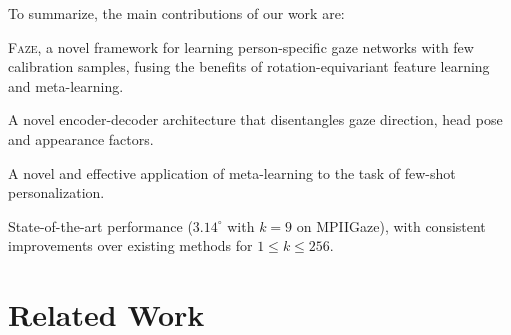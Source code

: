 \documentclass[10pt,twocolumn,letterpaper]{article}
\newcommand{\faze}[0]{\textsc{Faze}\xspace}
\begin{document}
\noindent To summarize, the main contributions of our work are: 
\begin{compactitem}
\item \faze, a novel framework for learning person-specific gaze networks with few calibration samples, fusing the benefits of rotation-equivariant feature learning and meta-learning.
\item A novel encoder-decoder architecture that disentangles gaze direction, head pose and appearance factors.
\item A novel and effective application of meta-learning to the task of few-shot personalization.
\item State-of-the-art performance ($3.14^{\circ}$ with $k=9$ on MPIIGaze), with consistent improvements over existing methods for $1\leq k\leq 256$. 

\end{compactitem}




































 
\section{Related Work}
\end{document}
